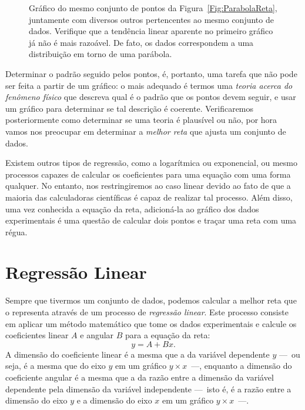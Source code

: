 \begin{figure*}
\centering
\forceversofloat
\caption{Gráfico do mesmo conjunto de pontos da Figura~\ref{Fig:ParabolaReta}, juntamente com diversos outros pertencentes ao mesmo conjunto de dados. Verifique que a tendência linear aparente no primeiro gráfico já não é mais razoável. De fato, os dados correspondem a uma distribuição em torno de uma parábola.}
\label{Fig:ParabolaReta2}

\end{figure*}

Determinar o padrão seguido pelos pontos, é, portanto, uma tarefa que não pode ser feita a partir de um gráfico: o mais adequado é termos uma \emph{teoria acerca do fenômeno físico} que descreva qual é o padrão que os pontos devem seguir, e usar um gráfico para determinar se tal descrição é coerente. Verificaremos posteriormente como determinar se uma teoria é plausível ou não, por hora vamos nos preocupar em determinar a \emph{melhor reta} que ajusta um conjunto de dados.

Existem outros tipos de regressão, como a logarítmica ou exponencial, ou mesmo processos capazes de calcular os coeficientes para uma equação com uma forma qualquer. No entanto, nos restringiremos ao caso linear devido ao fato de que a maioria das calculadoras científicas é capaz de realizar tal processo. Além disso, uma vez conhecida a equação da reta, adicioná-la ao gráfico dos dados experimentais é uma questão de calcular dois pontos e traçar uma reta com uma régua.%

\section{Regressão Linear}
\label{Sec:RegressaoLinear}

Sempre que tivermos um conjunto de dados, podemos calcular a melhor reta que o representa através de um processo de \emph{regressão linear}. Este processo consiste em aplicar um método matemático que tome os dados experimentais e calcule os coeficientes linear $A$ e angular $B$ para a equação da reta:
\begin{equation}
	y = A + Bx.
\end{equation}
%
A dimensão do coeficiente linear é a mesma que a da variável dependente $y$ ---~ou seja, é a mesma que do eixo $y$ em um gráfico $y \times x$~---, enquanto a dimensão do coeficiente angular é a mesma que a da razão entre a dimensão da variável dependente pela dimensão da variável independente ---~isto é, é a razão entre a dimensão do eixo $y$ e a dimensão do eixo $x$ em um gráfico $y \times x$~---. 


